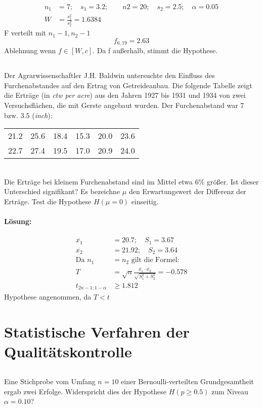 \documentclass[ngerman]{scrartcl}
\begin{document}
\begin{align*}
n_1 &= 7;\quad s_1 = 3.2;\qquad n2 = 20;\quad s_2 = 2.5;\quad \alpha = 0.05\\
W &= \frac{s_1^2}{s_2^2} = 1.6384
\end{align*}
F verteilt mit $n_1-1, n_2-1$\[
f_{6,19} = 2.63
\]
Ablehnung wenn $f\in [W,c]$. Da f außerhalb, stimmt die Hypothese.
\subsection{}
Der Agrarwissenschaftler J.H. Baldwin untersuchte den Einfluss des Furchenabstandes auf den Ertrag von Getreideanbau. Die folgende Tabelle zeigt die Erträge (in \emph{ctw per acre}) aus den Jahren 1927 bis 1931 und 1934 von zwei Versuchsflächen, die mit Gerste angebaut wurden. Der Furchenabstand war 7 bzw. 3.5 (\emph{inch}):\\
\begin{tabular}{c c c c c c}
\hline
21.2& 25.6& 18.4& 15.3& 20.0& 23.6\\
22.7& 27.4& 19.5& 17.0& 20.9& 24.0\\\hline
\end{tabular}\\
Die Erträge bei kleinem Furchenabstand sind im Mittel etwa $6\%$ größer. Ist dieser Unterschied signifikant? Es bezeichne $\mu$ den Erwartungswert der Differenz der Erträge. Test die Hypothese $H(\mu = 0)$ einseitig.
\paragraph{Lösung:}
\begin{align*}
\overline{x_1} &= 20.7;\quad S_1 = 3.67\\
\overline{x_2} &= 21.92;\quad S_2 = 3.64\\
\text{Da } n_1&= n_2\text{ gilt die Formel:}\\
T &= \sqrt{n}\frac{\overline{x_1}\cdot \overline{x_2}}{\sqrt{S_1^{2} + S_2^{2}}} = -0.578\\
t_{2n-1;1-\alpha} &\ge 1.812
\end{align*}
Hypothese angenommen, da $T < t$
\section{Statistische Verfahren der Qualitätskontrolle}
\subsection{}
Eine Stichprobe vom Umfang $n=10$ einer Bernoulli-verteilten Grundgesamtheit ergab zwei Erfolge. Widerspricht dies der Hypothese $H(p\geq 0.5)$ zum Niveau $\alpha=0.10$?
\end{document}
